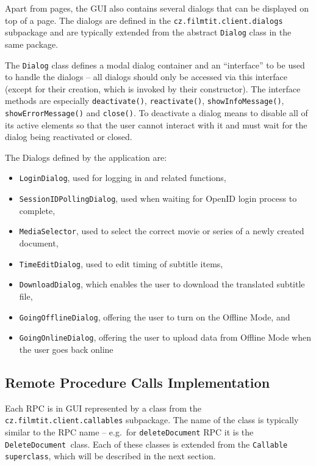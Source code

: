 Apart from pages, the GUI also contains several dialogs that can be displayed on top of a page. The dialogs are defined in the {\tt cz.filmtit.client.dialogs} subpackage and are typically extended from the abstract {\tt Dialog} class in the same package.

The {\tt Dialog} class defines a modal dialog container and an ``interface'' to be used to handle the dialogs -- all dialogs should only be accessed via this interface (except for their creation, which is invoked by their constructor).
The interface methods are especially
{\tt deactivate()}, {\tt reactivate()}, {\tt showInfoMessage()}, {\tt showErrorMessage()} and {\tt close()}. To deactivate a dialog means to disable all of its active elements so that the user cannot interact with it and must wait for the dialog being reactivated or closed.

The Dialogs defined by the application are:
\begin{itemize}
\item {\tt LoginDialog}, used for logging in and related functions,
\item {\tt SessionIDPollingDialog}, used when waiting for OpenID login process to complete,
\item {\tt MediaSelector}, used to select the correct movie or series of a newly created document,
\item {\tt TimeEditDialog}, used to edit timing of subtitle items,
\item {\tt DownloadDialog}, which enables the user to download the translated subtitle file,
\item {\tt GoingOfflineDialog}, offering the user to turn on the Offline Mode, and
\item {\tt GoingOnlineDialog}, offering the user to upload data from Offline Mode when the user goes back online
\end{itemize}

\subsection{Remote Procedure Calls Implementation}

Each RPC is in GUI represented by a class from the {\tt cz.filmtit.client.callables} subpackage. The name of the class is typically similar to the RPC name -- e.g.\ for {\tt deleteDocument} RPC it is the {\tt DeleteDocument }class. Each of these classes is extended from the {\tt Callable superclass}, which will be described in the next section.

